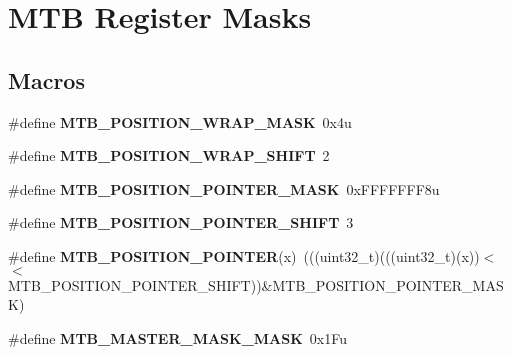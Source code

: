 \hypertarget{group___m_t_b___register___masks}{}\section{M\+TB Register Masks}
\label{group___m_t_b___register___masks}
\subsection*{Macros}
\begin{DoxyCompactItemize}
\item 
\mbox{\label{group___m_t_b___register___masks_ga78e2e577559e338f1c3b58cc1cc63805}} 
\#define {\bfseries M\+T\+B\+\_\+\+P\+O\+S\+I\+T\+I\+O\+N\+\_\+\+W\+R\+A\+P\+\_\+\+M\+A\+SK}~0x4u
\item 
\mbox{\label{group___m_t_b___register___masks_gab3f7a88c57218b9c54796e7d2f41ac2f}} 
\#define {\bfseries M\+T\+B\+\_\+\+P\+O\+S\+I\+T\+I\+O\+N\+\_\+\+W\+R\+A\+P\+\_\+\+S\+H\+I\+FT}~2
\item 
\mbox{\label{group___m_t_b___register___masks_gadb8fe67da29e5443d81624d913c6a5da}} 
\#define {\bfseries M\+T\+B\+\_\+\+P\+O\+S\+I\+T\+I\+O\+N\+\_\+\+P\+O\+I\+N\+T\+E\+R\+\_\+\+M\+A\+SK}~0x\+F\+F\+F\+F\+F\+F\+F8u
\item 
\mbox{\label{group___m_t_b___register___masks_ga7857f68d5a75794dbf744b3c484f782f}} 
\#define {\bfseries M\+T\+B\+\_\+\+P\+O\+S\+I\+T\+I\+O\+N\+\_\+\+P\+O\+I\+N\+T\+E\+R\+\_\+\+S\+H\+I\+FT}~3
\item 
\mbox{\label{group___m_t_b___register___masks_ga6521f4d89fa83ad4b901b931b36b2415}} 
\#define {\bfseries M\+T\+B\+\_\+\+P\+O\+S\+I\+T\+I\+O\+N\+\_\+\+P\+O\+I\+N\+T\+ER}(x)~(((uint32\+\_\+t)(((uint32\+\_\+t)(x))$<$$<$M\+T\+B\+\_\+\+P\+O\+S\+I\+T\+I\+O\+N\+\_\+\+P\+O\+I\+N\+T\+E\+R\+\_\+\+S\+H\+I\+FT))\&M\+T\+B\+\_\+\+P\+O\+S\+I\+T\+I\+O\+N\+\_\+\+P\+O\+I\+N\+T\+E\+R\+\_\+\+M\+A\+SK)
\item 
\mbox{\label{group___m_t_b___register___masks_ga718f776541b94b2e942aac9479a60963}} 
\#define {\bfseries M\+T\+B\+\_\+\+M\+A\+S\+T\+E\+R\+\_\+\+M\+A\+S\+K\+\_\+\+M\+A\+SK}~0x1\+Fu
$$
\end{DoxyCompactItemize}
